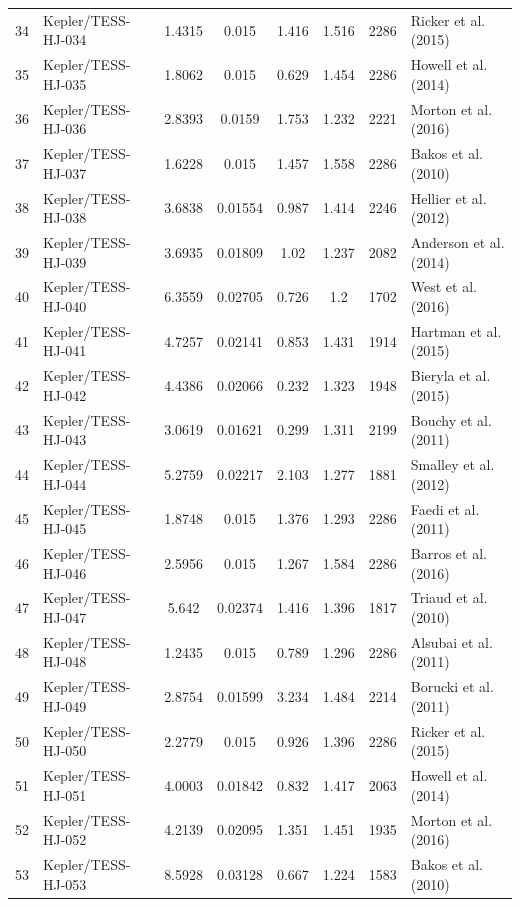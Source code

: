 \begin{longtable}{r l c c c c c p{4.2cm}}
34 & Kepler/TESS-HJ-034 & 1.4315 & 0.015 & 1.416 & 1.516 & 2286 & Ricker et al. (2015) \\
35 & Kepler/TESS-HJ-035 & 1.8062 & 0.015 & 0.629 & 1.454 & 2286 & Howell et al. (2014) \\
36 & Kepler/TESS-HJ-036 & 2.8393 & 0.0159 & 1.753 & 1.232 & 2221 & Morton et al. (2016) \\
37 & Kepler/TESS-HJ-037 & 1.6228 & 0.015 & 1.457 & 1.558 & 2286 & Bakos et al. (2010) \\
38 & Kepler/TESS-HJ-038 & 3.6838 & 0.01554 & 0.987 & 1.414 & 2246 & Hellier et al. (2012) \\
39 & Kepler/TESS-HJ-039 & 3.6935 & 0.01809 & 1.02 & 1.237 & 2082 & Anderson et al. (2014) \\
40 & Kepler/TESS-HJ-040 & 6.3559 & 0.02705 & 0.726 & 1.2 & 1702 & West et al. (2016) \\
41 & Kepler/TESS-HJ-041 & 4.7257 & 0.02141 & 0.853 & 1.431 & 1914 & Hartman et al. (2015) \\
42 & Kepler/TESS-HJ-042 & 4.4386 & 0.02066 & 0.232 & 1.323 & 1948 & Bieryla et al. (2015) \\
43 & Kepler/TESS-HJ-043 & 3.0619 & 0.01621 & 0.299 & 1.311 & 2199 & Bouchy et al. (2011) \\
44 & Kepler/TESS-HJ-044 & 5.2759 & 0.02217 & 2.103 & 1.277 & 1881 & Smalley et al. (2012) \\
45 & Kepler/TESS-HJ-045 & 1.8748 & 0.015 & 1.376 & 1.293 & 2286 & Faedi et al. (2011) \\
46 & Kepler/TESS-HJ-046 & 2.5956 & 0.015 & 1.267 & 1.584 & 2286 & Barros et al. (2016) \\
47 & Kepler/TESS-HJ-047 & 5.642 & 0.02374 & 1.416 & 1.396 & 1817 & Triaud et al. (2010) \\
48 & Kepler/TESS-HJ-048 & 1.2435 & 0.015 & 0.789 & 1.296 & 2286 & Alsubai et al. (2011) \\
49 & Kepler/TESS-HJ-049 & 2.8754 & 0.01599 & 3.234 & 1.484 & 2214 & Borucki et al. (2011) \\
50 & Kepler/TESS-HJ-050 & 2.2779 & 0.015 & 0.926 & 1.396 & 2286 & Ricker et al. (2015) \\
51 & Kepler/TESS-HJ-051 & 4.0003 & 0.01842 & 0.832 & 1.417 & 2063 & Howell et al. (2014) \\
52 & Kepler/TESS-HJ-052 & 4.2139 & 0.02095 & 1.351 & 1.451 & 1935 & Morton et al. (2016) \\
53 & Kepler/TESS-HJ-053 & 8.5928 & 0.03128 & 0.667 & 1.224 & 1583 & Bakos et al. (2010) \\

\end{longtable}
